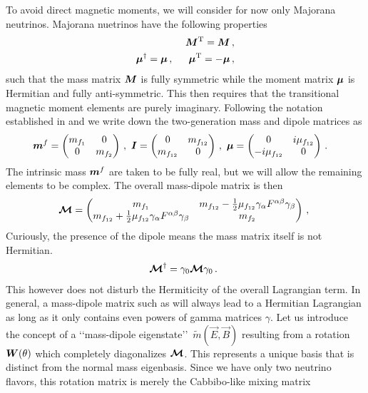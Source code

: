 To avoid direct magnetic moments, we will consider for now only Majorana neutrinos. Majorana nuetrinos have the following properties
\begin{alignat}{1}
	\label{mix:eq:00a}	\bb{M}^{\mathrm{T}}=\bb{M}\,,\\
	\label{mix:eq:00b}	\bb{\mu}^{\dagger}=\bb{\mu}\,,\indent\bb{\mu}^{\mathrm{T}}=-\bb{\mu}\,,
\end{alignat}
such that the mass matrix $\boldsymbol{M}$ is fully symmetric while the moment matrix $\boldsymbol{\mu}$ is Hermitian and fully anti-symmetric. This then requires that the transitional magnetic moment elements are purely imaginary. Following the notation established in  and  we write down the two-generation mass and dipole matrices as
\begin{alignat}{1}
	\label{mix:eq:01a} \bb{m}^{f} &= 
	\begin{pmatrix}
		m_{f_{1}} & 0\\
		0 & m_{f_{2}}
	\end{pmatrix}\,,\ 
	\bb{I} = 
	\begin{pmatrix}
		0 & m_{f_{12}}\\
		m_{f_{12}} & 0
	\end{pmatrix}\,,\ 
	\bb{\mu} = 
	\begin{pmatrix}
		0 & i\mu_{f_{12}}\\
		-i\mu_{f_{12}} & 0
	\end{pmatrix}\,.
\end{alignat}
The intrinsic mass $\boldsymbol{m}^{f}$ are taken to be fully real, but we will allow the remaining elements to be complex. The overall mass-dipole matrix is then
\begin{alignat}{1}
	\label{mix:eq:02} \bb{\mathcal{M}} = 
	\begin{pmatrix}
		m_{f_{1}} & m_{f_{12}}-\frac{1}{2}\mu_{f_{12}}\gamma_{\alpha}F^{\alpha\beta}\gamma_{\beta}\\
		m_{f_{12}}+\frac{1}{2}\mu_{f_{12}}\gamma_{\alpha}F^{\alpha\beta}\gamma_{\beta} & m_{f_{2}}
	\end{pmatrix}\,,\ 
\end{alignat}
Curiously, the presence of the dipole means the mass matrix itself is not Hermitian.
\begin{alignat}{1}
	\label{mix:eq:03} \bb{\mathcal{M}}^{\dagger} = \gamma_{0}\bb{\mathcal{M}}\gamma_{0}\,.\ 
\end{alignat}
This however does not disturb the Hermiticity of the overall Lagrangian term. In general, a mass-dipole matrix such as  will always lead to a Hermitian Lagrangian as long as it only contains even powers of gamma matrices $\gamma$. Let us introduce the concept of a \lq\lq mass-dipole eigenstate\rq\rq\ $\widetilde{m}(\vec{E},\vec{B})$ resulting from a rotation $\boldsymbol{W}(\theta)$ which completely diagonalizes $\boldsymbol{\mathcal{M}}$. This represents a unique basis that is distinct from the normal mass eigenbasis. Since we have only two neutrino flavors, this rotation matrix is merely the Cabbibo-like mixing matrix
